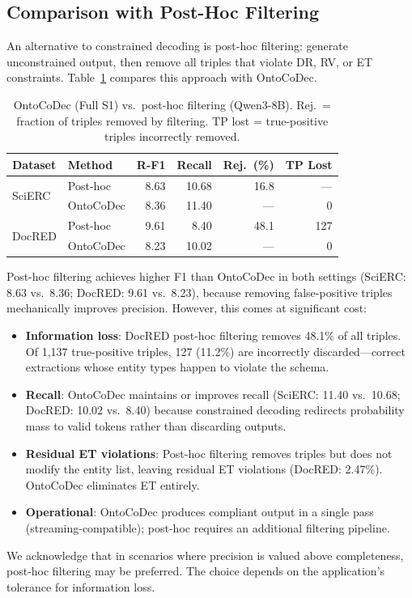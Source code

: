\documentclass[11pt,a4paper]{article}
\newcommand{\sys}{OntoCoDec\xspace}
\begin{document}
\subsection{Comparison with Post-Hoc Filtering}
\label{sec:posthoc}

An alternative to constrained decoding is post-hoc filtering: generate unconstrained output, then remove all triples that violate DR, RV, or ET constraints.
Table~\ref{tab:posthoc} compares this approach with \sys.

\begin{table}[t]
\centering
\caption{OntoCoDec (Full S1) vs.\ post-hoc filtering (Qwen3-8B). Rej.\ = fraction of triples removed by filtering. TP lost = true-positive triples incorrectly removed.}
\label{tab:posthoc}
\small
\begin{tabular}{llrrrr}
\toprule
\textbf{Dataset} & \textbf{Method} & \textbf{R-F1} & \textbf{Recall} & \textbf{Rej.\ (\%)} & \textbf{TP Lost} \\
\midrule
\multirow{2}{*}{SciERC}
 & Post-hoc     & 8.63 & 10.68 & 16.8 & --- \\
 & OntoCoDec    & 8.36 & 11.40 & ---  & 0 \\
\midrule
\multirow{2}{*}{DocRED}
 & Post-hoc     & 9.61 & 8.40  & 48.1 & 127 \\
 & OntoCoDec    & 8.23 & 10.02 & ---  & 0 \\
\bottomrule
\end{tabular}
\end{table}

Post-hoc filtering achieves higher F1 than \sys in both settings (SciERC: 8.63 vs.\ 8.36; DocRED: 9.61 vs.\ 8.23), because removing false-positive triples mechanically improves precision.
However, this comes at significant cost:
\begin{itemize}[nosep]
    \item \textbf{Information loss}: DocRED post-hoc filtering removes 48.1\% of all triples. Of 1{,}137 true-positive triples, 127 (11.2\%) are incorrectly discarded---correct extractions whose entity types happen to violate the schema.
    \item \textbf{Recall}: \sys maintains or improves recall (SciERC: 11.40 vs.\ 10.68; DocRED: 10.02 vs.\ 8.40) because constrained decoding redirects probability mass to valid tokens rather than discarding outputs.
    \item \textbf{Residual ET violations}: Post-hoc filtering removes triples but does not modify the entity list, leaving residual ET violations (DocRED: 2.47\%). \sys eliminates ET entirely.
    \item \textbf{Operational}: \sys produces compliant output in a single pass (streaming-compatible); post-hoc requires an additional filtering pipeline.
\end{itemize}
We acknowledge that in scenarios where precision is valued above completeness, post-hoc filtering may be preferred.
The choice depends on the application's tolerance for information loss.
\end{document}
